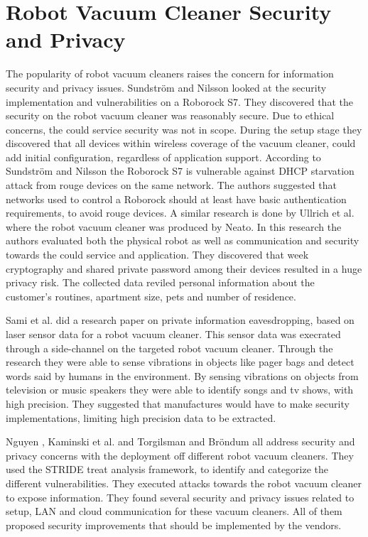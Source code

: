 \section{Robot Vacuum Cleaner Security and Privacy}
The popularity of robot vacuum cleaners raises the concern for information security and privacy issues. Sundström and Nilsson \cite{Roborockvulnerability} looked at the security implementation and vulnerabilities on a Roborock S7. They discovered that the security on the robot vacuum cleaner was reasonably secure. Due to ethical concerns, the could service security was not in scope. During the setup stage they discovered that all devices within wireless coverage of the vacuum cleaner, could add initial configuration, regardless of application support. According to Sundström and Nilsson \cite{Roborockvulnerability} the Roborock S7 is vulnerable against DHCP starvation attack from rouge devices on the same network. The authors suggested that networks used to control a Roborock should at least have basic authentication requirements, to avoid rouge devices. 
A similar research is done by Ullrich et al.\cite{Neato} where the robot vacuum cleaner was produced by Neato. In this research the authors evaluated both the physical robot as well as communication and security towards the could service and application. They discovered that week cryptography and shared private password among their devices resulted in a huge privacy risk. The collected data reviled personal information about the customer's routines, apartment size, pets and number of residence. 

Sami et al. \cite{lindaeavesdropping} did a research paper on private information eavesdropping, based on laser sensor data for a robot vacuum cleaner.  This sensor data was execrated through a side-channel on the targeted robot vacuum cleaner. Through the research they were able to sense vibrations in objects like pager bags and detect words said by humans in the environment. By sensing vibrations on objects from television or music speakers they were able to identify songs and tv shows, with high precision. They suggested that manufactures would have to make security implementations, limiting high precision data to be extracted.

Nguyen \cite{robotvacuum_voulne_nguyendeep}, Kaminski et al. \cite{robotvacuum_voulne1_kaminski2016averting} and Torgilsman and Bröndum\cite{robotvacuum_voulne2_torgilsman2020ethical} all address security and privacy concerns with the deployment off different robot vacuum cleaners. They used the STRIDE treat analysis framework, to identify and categorize the different vulnerabilities. They executed attacks towards the robot vacuum cleaner to expose information. They found several security and privacy issues related to setup, LAN and cloud communication for these vacuum cleaners. All of them proposed security improvements that should be implemented by the vendors. 

